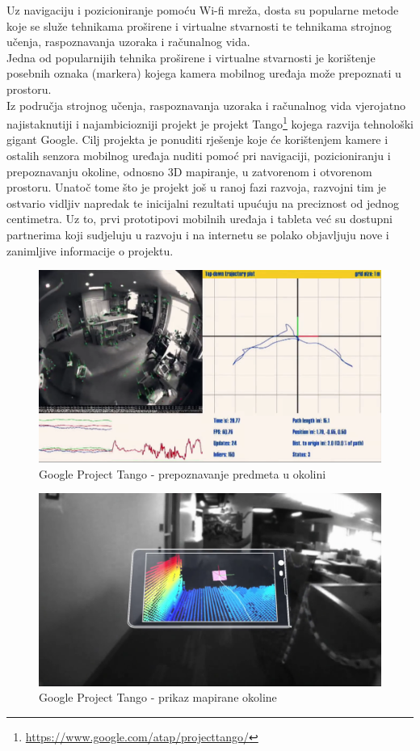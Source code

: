 Uz navigaciju i pozicioniranje pomoću Wi-fi mreža, dosta su popularne metode koje se služe tehnikama proširene i virtualne stvarnosti te tehnikama strojnog učenja, raspoznavanja uzoraka i računalnog vida.
\\
Jedna od popularnijih tehnika proširene  i virtualne stvarnosti je korištenje posebnih oznaka (markera) kojega kamera mobilnog uređaja može prepoznati u prostoru.
\\

Iz područja strojnog učenja, raspoznavanja uzoraka i računalnog vida vjerojatno najistaknutiji i najambiciozniji projekt je projekt Tango\footnote{\url{https://www.google.com/atap/projecttango/}} kojega razvija tehnološki gigant Google. 
Cilj projekta je ponuditi rješenje koje će korištenjem kamere i ostalih senzora mobilnog uređaja nuditi pomoć pri navigaciji, pozicioniranju i prepoznavanju okoline, odnosno 3D mapiranje, u zatvorenom i otvorenom prostoru. 
Unatoč tome što je projekt još u ranoj fazi razvoja, razvojni tim je ostvario vidljiv napredak te inicijalni rezultati upućuju na preciznost od jednog centimetra. 
Uz to, prvi prototipovi mobilnih uređaja i tableta već su dostupni partnerima koji sudjeluju u razvoju i na internetu se polako objavljuju nove i zanimljive informacije o projektu. 

\begin{figure}[H]
    \centering
    \includegraphics[scale=0.24]{pictures/tango1}
    \caption{Google Project Tango - prepoznavanje predmeta u okolini \citep{ytTango}}
\end{figure}

\begin{figure}[H]
    \centering
    \includegraphics[scale=0.24]{pictures/tango2}
    \caption{Google Project Tango - prikaz mapirane okoline \citep{ytTango}}
\end{figure}

